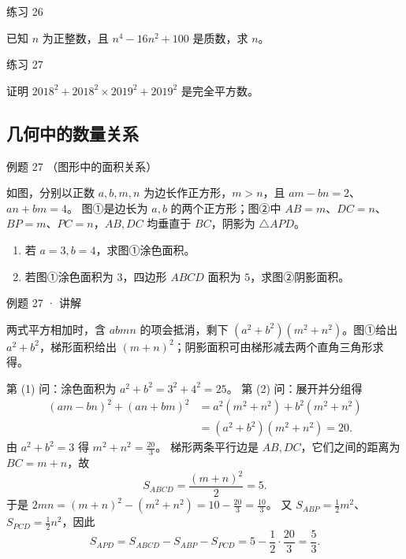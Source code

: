
\begin{problem}{练习 26}

已知 $n$ 为正整数，且 $n^4-16n^2+100$ 是质数，求 $n$。

\end{problem}

\begin{problem}{练习 27}

证明 $2018^2+2018^2\times2019^2+2019^2$ 是完全平方数。

\end{problem}


\subsection{几何中的数量关系}



\begin{problem}{例题 27 （图形中的面积关系）}

如图，分别以正数 $a,b,m,n$ 为边长作正方形，$m>n$，且 $am-bn=2$、$an+bm=4$。
图①是边长为 $a,b$ 的两个正方形；图②中 $AB=m$、$DC=n$、$BP=m$、$PC=n$，$AB,DC$ 均垂直于 $BC$，阴影为 $\triangle APD$。
\begin{enumerate}[label=(\arabic*)]
\item 若 $a=3,b=4$，求图①涂色面积。
\item 若图①涂色面积为 $3$，四边形 $ABCD$ 面积为 $5$，求图②阴影面积。
\end{enumerate}
\factorfigure

\end{problem}


\begin{solution}{例题 27 · 讲解}

\think 两式平方相加时，含 $abmn$ 的项会抵消，剩下 $(a^2+b^2)(m^2+n^2)$。图①给出 $a^2+b^2$，梯形面积给出 $(m+n)^2$；阴影面积可由梯形减去两个直角三角形求得。

\solve 第 (1) 问：涂色面积为 $a^2+b^2=3^2+4^2=25$。
第 (2) 问：展开并分组得
\begin{align*}
(am-bn)^2+(an+bm)^2&=a^2(m^2+n^2)+b^2(m^2+n^2)\\
&=(a^2+b^2)(m^2+n^2)=20.
\end{align*}
由 $a^2+b^2=3$ 得 $m^2+n^2=\frac{20}{3}$。
梯形两条平行边是 $AB,DC$，它们之间的距离为 $BC=m+n$，故
\[S_{ABCD}=\frac{(m+n)^2}{2}=5.\]
于是 $2mn=(m+n)^2-(m^2+n^2)=10-\frac{20}{3}=\frac{10}{3}$。
又 $S_{ABP}=\frac12m^2$、$S_{PCD}=\frac12n^2$，因此
\[S_{APD}=S_{ABCD}-S_{ABP}-S_{PCD}=5-\frac12\cdot\frac{20}{3}=\frac53.\]


\end{solution}

